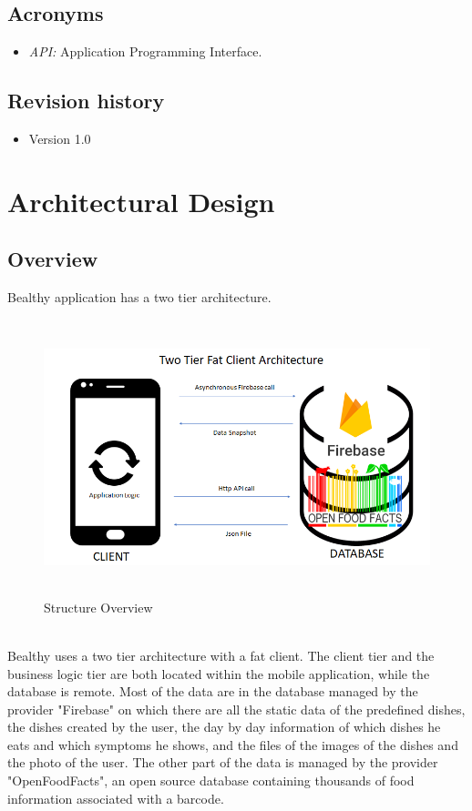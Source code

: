\documentclass [12pt]{article}
\begin{document}
\subsection{Acronyms}
\begin{itemize}
\item\textit{API:} Application Programming Interface.
\end{itemize}

\subsection{Revision history}
\begin{itemize}
\item Version 1.0
\end{itemize}


\section{Architectural Design}
\subsection{Overview}
Bealthy application has a two tier architecture.
\begin{figure}[ht!]
\centering
\includegraphics[height=8cm, width=\linewidth]{ArchitectureTwoTier.png}
\caption{Structure Overview} 
\end{figure}
\\
Bealthy uses a two tier architecture with a fat client. The client tier and the business logic tier are both located within the mobile application, while the database is remote. Most of the data are in the database managed by the provider "Firebase" on which there are all the static data of the predefined dishes, the dishes created by the user, the day by day information of which dishes he eats and which symptoms he shows, and the files of the images of the dishes and the photo of the user. The other part of the data is managed by the provider "OpenFoodFacts", an open source database containing thousands of food information associated with a barcode.
\end{document}
